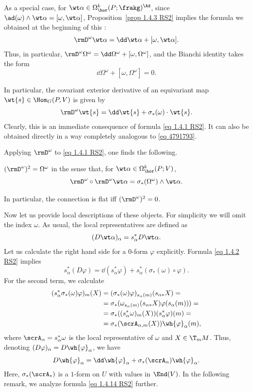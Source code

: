 \begin{rem}
    As a special case, for $\wt\alpha\in\Omega^k_{\hor}(P;\frakg)^\Ad$, since $\ad (\omega)\wedge\wt\alpha=[\omega,\wt\alpha]$, Proposition~\ref{prop 1.4.3 RS2} implies the formula we obtained at the beginning of this \sect:
    \[\rmD^\omega\wt\alpha=\dd\wt\alpha+[\omega,\wt\alpha].\]
    Thus, in particular, $\rmD^\omega\Omega^\omega=\dd\Omega^\omega+[\omega,\Omega^\omega]$, and the Bianchi identity takes the form
    \[\dd\Omega^\omega+[\omega,\Omega^\omega]=0.\label{eq 1.4.11 RS2 Bianchi}\]
\end{rem}


\begin{rem}\label{rem 1.4.4 RS2}
    In particular, the covariant exterior derivative of an equivariant map $\wt{s}\in\Hom_G(P,V)$ is given by
    \[\rmD^\omega\wt{s}=\dd\wt{s}+\sigma_\ast(\omega)\cdot \wt{s}.\label{eq 1.4.2 RS2}\]
    Clearly, this is an immediate consequence of formula \eqref{eq 1.4.1 RS2}. It can also be obtained directly in a way completely analogous to \eqref{eq 4791793}.
\end{rem}

Applying $\rmD^\omega$ to \eqref{eq 1.4.1 RS2}, one finds the following.

\begin{prop}[{{\cite[Prop.~1.4.13]{RS2}}}] \label{prop 1.4.13 RS2}
    $(\rmD^\omega)^2=\Omega^\omega$ in the sense that, for $\wt\alpha\in \Omega^k_{\hor}(P;V)$,
    \[\rmD^\omega\circ \rmD^\omega\wt\alpha=\sigma_\ast(\Omega^\omega)\wedge\wt\alpha.\]
\end{prop}
In particular, the connection is flat iff $(\rmD^\omega)^2=0$.

Now let us provide local descriptions of these objects. For simplicity we will omit the index $\omega$. As usual, the local representatives are defined as
\[(D\wt\alpha)_\alpha=s_\alpha^\ast D\wt\alpha.\]
Let us calculate the right hand side for a $0$-form $\varphi$ explicitly. Formula \eqref{eq 1.4.2 RS2} implies
\[s_\alpha^\ast(D\varphi)=\dd(s_\alpha^\ast\varphi)+s_\alpha^\ast(\sigma_\ast(\omega)\circ\varphi).\]
For the second term, we calculate
\begin{align}
    (s_\alpha^\ast\sigma_\ast(\omega)\varphi)_m(X)&=(\sigma_\ast(\omega)\varphi)_{s_\alpha(m)}(s_{\alpha\ast}X)=\notag\\
    &=\sigma_\ast(\omega_{s_\alpha(m)}(s_{\alpha\ast}X)\varphi(s_\alpha(m)))=\notag\\
    &=\sigma_\ast((s_\alpha^\ast\omega)_m(X))(s_\alpha^\ast\varphi)(m)=\notag\\
    &=\sigma_\ast(\scrA_{\alpha,m}(X))\wh{\varphi}_\alpha(m),
\end{align}
where $\scrA_\alpha=s_\alpha^\ast\omega$ is the local representative of $\omega$ and $X\in \T_mM$. Thus, denoting $(D\varphi)_\alpha=D\wh{\varphi}_\alpha$, we have
\[D\wh{\varphi}_\alpha=\dd\wh{\varphi}_\alpha+\sigma_\ast(\scrA_\alpha)\wh{\varphi}_\alpha.\label{eq 1.4.14 RS2}\]
Here, $\sigma_\ast(\scrA_\ast)$ is a $1$-form on $U$ with values in $\End(V)$. In the following remark, we analyze formula \eqref{eq 1.4.14 RS2} further.

